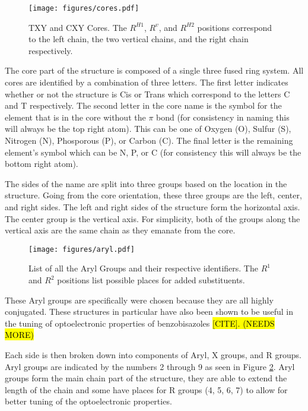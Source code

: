 \documentclass[10pt]{article}
\begin{document}
\begin{figure}[H]
  \begin{center}
    \texttt{[image: figures/cores.pdf]}
  \end{center}
  \caption{TXY and CXY Cores. The $R^{H1}$, $R^v$, and $R^{H2}$ positions correspond to the left chain, the two vertical chains, and the right chain respectively.}
  \label{fig:cores}
\end{figure}

The core part of the structure is composed of a single three fused ring system. All cores are identified by a combination of three letters. The first letter indicates whether or not the structure is Cis or Trans which correspond to the letters C and T respectively. The second letter in the core name is the symbol for the element that is in the core without the $\pi$ bond (for consistency in naming this will always be the top right atom). This can be one of Oxygen (O), Sulfur (S), Nitrogen (N), Phosporous (P), or Carbon (C). The final letter is the remaining element's symbol which can be N, P, or C (for consistency this will always be the bottom right atom).

The sides of the name are split into three groups based on the location in the structure. Going from the core orientation, these three groups are the left, center, and right sides. The left and right sides of the structure form the horizontal axis. The center group is the vertical axis. For simplicity, both of the groups along the vertical axis are the same chain as they emanate from the core.

\begin{figure}[H]
  \begin{center}
    \texttt{[image: figures/aryl.pdf]}
  \end{center}
  \caption{List of all the Aryl Groups and their respective identifiers. The $R^1$ and $R^2$ positions list possible places for added substituents.}
  \label{fig:Aryl}
\end{figure}

These Aryl groups are specifically were chosen because they are all highly conjugated. These structures in particular have also been shown to be useful in the tuning of optoelectronic properties of benzobisazoles \hl{[CITE]. (NEEDS MORE)}

Each side is then broken down into components of Aryl, X groups, and R groups. Aryl groups are indicated by the numbers 2 through 9 as seen in Figure \ref{fig:Aryl}. Aryl groups form the main chain part of the structure, they are able to extend the length of the chain and some have places for R groups (4, 5, 6, 7) to allow for better tuning of the optoelectronic properties.
\end{document}
